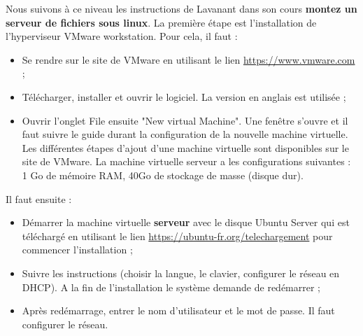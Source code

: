\documentclass[a4paper,12pt,french]{report} %
\begin{document}
Nous suivons à ce niveau les instructions de Lavanant dans son cours \textbf{montez un serveur de fichiers sous linux}.
La première étape est l'installation de l'hyperviseur VMware workstation. Pour cela,  il faut :
\begin{itemize}
	\item Se rendre sur le site de VMware en  utilisant le lien \url{https://www.vmware.com} ; %
	\item Télécharger, installer et ouvrir le logiciel. La version en anglais est utilisée ; 
	\item Ouvrir l'onglet File ensuite "New virtual Machine". Une fenêtre s'ouvre et il faut suivre le guide durant la configuration de la nouvelle machine virtuelle. Les différentes étapes d'ajout d'une machine virtuelle sont disponibles sur le site de VMware. La machine virtuelle serveur a les configurations suivantes : 1 Go de mémoire RAM, 40Go de stockage de masse (disque dur).
\end{itemize}

Il faut ensuite :
\begin{itemize}
	\item Démarrer la machine virtuelle \textbf{serveur} avec le disque Ubuntu Server qui est téléchargé en utilisant le lien \url{https://ubuntu-fr.org/telechargement} pour commencer l'installation ; 
	\item Suivre les instructions (choisir la langue, le clavier, configurer le réseau en DHCP). A la fin de l'installation le système demande de redémarrer ;
	\item  Après redémarrage, entrer le nom d'utilisateur et le mot de passe. Il faut configurer le réseau. 
\end{itemize}
\end{document}
